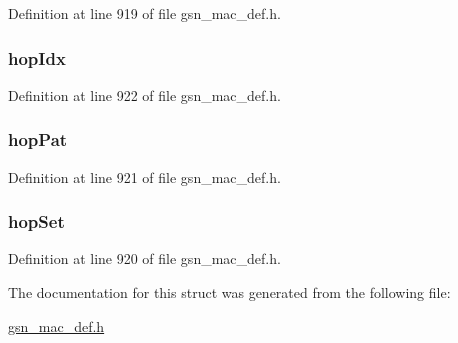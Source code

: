 Definition at line 919 of file gsn\_\-mac\_\-def.h.

\hypertarget{a00120_aa07d34eeb025eb5e4aba050a623bc569}{
\subsubsection[{hopIdx}]{ {\bf hopIdx}}}
\label{a00120_aa07d34eeb025eb5e4aba050a623bc569}


Definition at line 922 of file gsn\_\-mac\_\-def.h.

\hypertarget{a00120_ad65126d514273f7ccbc531bc1a702fe5}{
\subsubsection[{hopPat}]{ {\bf hopPat}}}
\label{a00120_ad65126d514273f7ccbc531bc1a702fe5}


Definition at line 921 of file gsn\_\-mac\_\-def.h.

\hypertarget{a00120_ac3a5dec5476623532501f5dfb5bda3aa}{
\subsubsection[{hopSet}]{ {\bf hopSet}}}
\label{a00120_ac3a5dec5476623532501f5dfb5bda3aa}


Definition at line 920 of file gsn\_\-mac\_\-def.h.



The documentation for this struct was generated from the following file:\begin{DoxyCompactItemize}
\item 
\hyperlink{a00522}{gsn\_\-mac\_\-def.h}\end{DoxyCompactItemize}

